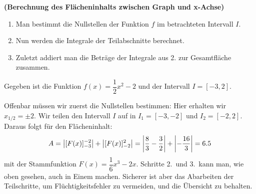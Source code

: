 \documentclass[ngerman, 12pt]{nssheetxea}
\begin{document}
\begin{theorem} \textbf{(Berechnung des Flächeninhalts zwischen Graph und x-Achse)} 
\begin{enumerate}
\item Man bestimmt die Nullstellen der Funktion $f$ im betrachteten Intervall $I$.
\item Nun werden die Integrale der Teilabschnitte berechnet.
\item Zuletzt addiert man die Beträge der Integrale aus 2. zur Gesamtfläche zusammen.
\end{enumerate}
\label{Satz:Int_FlächeX}
\end{theorem}

\begin{example}
Gegeben ist die Funktion $f(x)=\dfrac{1}{2}x^2-2$ und der Intervall $I=[-3,2]$. 
\begin{center}
\end{center}
Offenbar müssen wir zuerst die Nullstellen bestimmen: Hier erhalten wir $x_{1/2}=\pm 2$. Wir teilen den Intervall $I$ auf in $I_1=[-3,-2]$ und $I_2=[-2,2]$. Daraus folgt für den Flächeninhalt:
\[ A = \mleft| [F(x)]_{-3}^{-2}  \mright| + \mleft| [F(x)]_{-2}^2  \mright| = \mleft| \dfrac{8}{3}- \dfrac{3}{2} \mright| + \mleft| - \dfrac{16}{3} \mright| = \num{6,5}\]
mit der Stammfunktion $F(x)=\dfrac{1}{6}x^3-2x$. Schritte 2.\ und 3.\ kann man, wie oben gesehen, auch in Einem machen. Sicherer ist aber das Abarbeiten der Teilschritte, um Flüchtigkeitsfehler zu vermeiden, und die Übersicht zu behalten.
\end{example}
\end{document}
